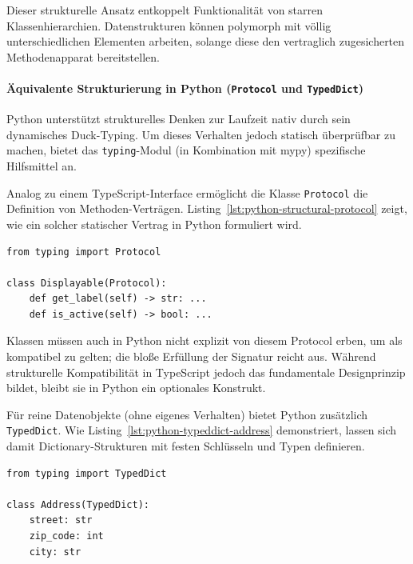 Dieser strukturelle Ansatz entkoppelt Funktionalität von starren Klassenhierarchien. Datenstrukturen können polymorph mit völlig unterschiedlichen Elementen arbeiten, solange diese den vertraglich zugesicherten Methodenapparat bereitstellen.


\paragraph{Äquivalente Strukturierung in Python (\texttt{Protocol} und \texttt{TypedDict})}
\label{par:python-protocol-typeddict}

Python unterstützt strukturelles Denken zur Laufzeit nativ durch sein dynamisches Duck-Typing. Um dieses Verhalten jedoch statisch überprüfbar zu machen, bietet das \texttt{typing}-Modul (in Kombination mit mypy) spezifische Hilfsmittel an. 

Analog zu einem TypeScript-Interface ermöglicht die Klasse \texttt{Protocol} die Definition von Methoden-Verträgen. Listing~\ref{lst:python-structural-protocol} zeigt, wie ein solcher statischer Vertrag in Python formuliert wird.

\begin{listing}[htbp]
    \caption{Ein Protocol in Python als statischer Vertrag}
    \label{lst:python-structural-protocol}
    \begin{verbatim}
from typing import Protocol

class Displayable(Protocol):
    def get_label(self) -> str: ...
    def is_active(self) -> bool: ...
    \end{verbatim}
\end{listing}

Klassen müssen auch in Python nicht explizit von diesem Protocol erben, um als kompatibel zu gelten; die bloße Erfüllung der Signatur reicht aus. Während strukturelle Kompatibilität in TypeScript jedoch das fundamentale Designprinzip bildet, bleibt sie in Python ein optionales Konstrukt.

Für reine Datenobjekte (ohne eigenes Verhalten) bietet Python zusätzlich \texttt{TypedDict}. Wie Listing~\ref{lst:python-typeddict-address} demonstriert, lassen sich damit Dictionary-Strukturen mit festen Schlüsseln und Typen definieren.

\begin{listing}[htbp]
    \caption{Feste Datenstruktur mit TypedDict in Python}
    \label{lst:python-typeddict-address}
    \begin{verbatim}
from typing import TypedDict

class Address(TypedDict):
    street: str
    zip_code: int
    city: str
    \end{verbatim}
\end{listing}

